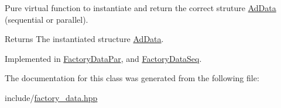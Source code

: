 \-Pure virtual function to instantiate and return the correct struture \hyperlink{classAdData}{\-Ad\-Data} (sequential or parallel). 

\begin{DoxyReturn}{\-Returns}
\-The instantiated structure \hyperlink{classAdData}{\-Ad\-Data}. 
\end{DoxyReturn}


\-Implemented in \hyperlink{classFactoryDataPar_a90e41820a2c94e76c947f4a4ee7809fb}{\-Factory\-Data\-Par}, and \hyperlink{classFactoryDataSeq_ac229b96239d9041f856fe63dcfc6c24f}{\-Factory\-Data\-Seq}.



\-The documentation for this class was generated from the following file\-:\begin{DoxyCompactItemize}
\item 
include/\hyperlink{factory__data_8hpp}{factory\-\_\-data.\-hpp}\end{DoxyCompactItemize}
